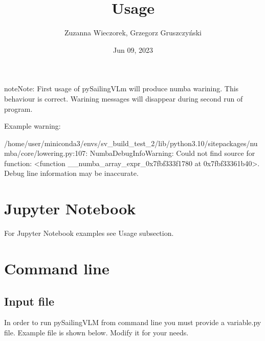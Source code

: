 \documentclass[a4paper,12pt,english]{jupyterBook}
\title{Usage}
\date{Jun 09, 2023}
\author{Zuzanna Wieczorek, Grzegorz Gruszczyński}
\begin{document}
\pagestyle{empty}
\sphinxmaketitle
\clearpage

\pagestyle{plain}
\sphinxtableofcontents
\pagestyle{normal}
\label{\detokenize{chapters/usage/usage::doc}}


\begin{sphinxadmonition}{note}{Note:}
\sphinxAtStartPar
First usage of pySailingVLm will produce numba warining. This behaviour is correct. Warining messages will disappear during second run of program.

\sphinxAtStartPar
Example warning:

\sphinxAtStartPar
/home/user/miniconda3/envs/sv\_build\_test\_2/lib/python3.10/site\sphinxhyphen{}packages/numba/core/lowering.py:107: NumbaDebugInfoWarning: Could not find source for function: <function \_\_numba\_array\_expr\_0x7fbf333f1780 at 0x7fbf33361b40>. Debug line information may be inaccurate.
\end{sphinxadmonition}


\part{Jupyter Notebook}
\label{\detokenize{chapters/usage/usage:jupyter-notebook}}
\sphinxAtStartPar
For Jupyter Notebook examples see Usage subsection.


\part{Command line}
\label{\detokenize{chapters/usage/usage:command-line}}

\chapter{Input file}
\label{\detokenize{chapters/usage/usage:input-file}}
\sphinxAtStartPar
In order to run pySailingVLM from command line you must provide a variable.py file. Example file is shown below. Modify it for your needs.
\end{document}
